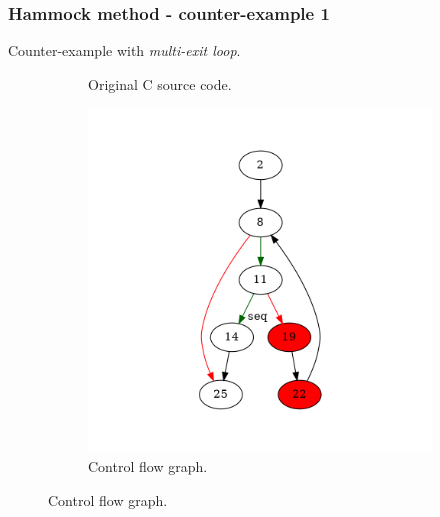 \documentclass[aspectratio=1610]{beamer}
\begin{document}
\begin{frame}[noframenumbering]
	\frametitle{Hammock method - counter-example 1}
	Counter-example with \textit{multi-exit loop}.
	\begin{figure}[htbp]
		\centering
		\begin{subfigure}[b]{0.30\textwidth}
			\centering
			
			\caption{Original C source code.}
		\end{subfigure}
		\begin{subfigure}[b]{0.50\textwidth}
			\centering
			\includegraphics[height=0.6\paperheight]{inc/methods/hammock/counter-example/with-break/main_0001a.png}
			\caption{Control flow graph.}
		\end{subfigure}
	\end{figure}
\end{frame}
\end{document}
